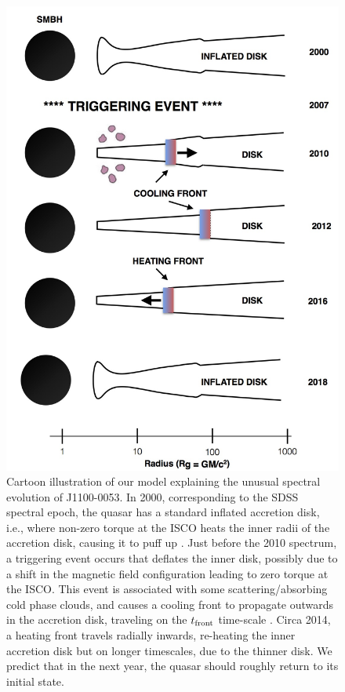\documentclass[a4paper,fleqn,usenatbib]{mnras}
\begin{document}
\begin{figure}
  \includegraphics[width=15.4cm, trim=0.0cm 0.0cm 0.0cm 0.0cm, clip]
  {../plots/models/cartoon_v3pnt1.jpg}
  \centering
  \caption[]{
    Cartoon illustration of our model explaining the unusual spectral
evolution of J1100-0053. In 2000, corresponding to the SDSS spectral
epoch, the quasar has a standard inflated accretion disk, i.e., where
non-zero torque at the ISCO heats the inner radii of the accretion
disk, causing it to puff up \citep[e.g.,][]{Zimmerman2005}. Just before the 
2010 spectrum, a triggering event occurs that deflates the inner disk, possibly
due to a shift in the magnetic field configuration leading to zero
torque at the ISCO.  This event is associated with some scattering/absorbing cold phase clouds, and
causes a cooling front to propagate outwards in the accretion disk,
traveling on the $t_{\rm front}$ time-scale 
\citep[see also][]{Hameury2009}. 
 Circa 2014, a heating front travels radially inwards, re-heating the inner accretion disk but
on longer timescales, due to the thinner disk. We predict that in the
next year, the quasar should roughly return to its initial state.}
  \label{fig:J110057_diskmodel}
\end{figure}
\end{document}
